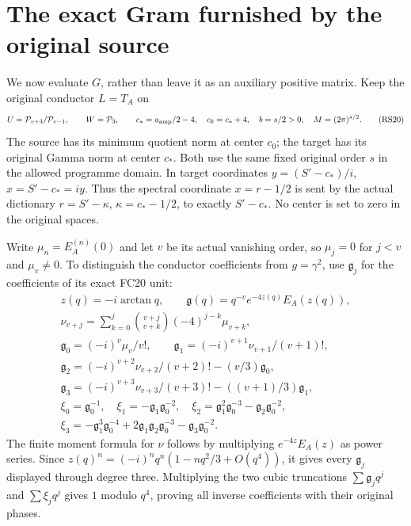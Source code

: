 \section{The exact Gram furnished by the original source}
We now evaluate $G$, rather than leave it as an auxiliary
positive matrix. Keep the original conductor $L=T_A$ on
\begin{equation}
 U=\mathcal P_{v+3}/\mathcal P_{v-1},\qquad
 W=\mathcal P_3,\qquad
 c_*=a_{\rm amp}/2-4,\quad c_0=c_*+4,\quad
 b=s/2>0,\quad M=(2\pi)^{s/2}.
 \tag{RS20}
\end{equation}
The source has its minimum quotient norm at center $c_0$;
the target has its original Gamma norm at center $c_*$.
Both use the same fixed original order $s$ in the allowed
programme domain. In target coordinates
$y=(S'-c_*)/i$, $x=S'-c_*=iy$.
Thus the spectral coordinate $x=r-1/2$ is sent by the actual
dictionary $r=S'-\kappa$, $\kappa=c_*-1/2$, to exactly
$S'-c_*$. No center is set to zero in the original spaces.

Write $\mu_n=E_A^{(n)}(0)$ and let $v$ be its actual
vanishing order, so $\mu_j=0$ for $j<v$ and $\mu_v\ne0$.
To distinguish the conductor coefficients from $g=\gamma^2$,
use $\mathfrak g_j$ for the coefficients of its exact FC20 unit:
\begin{equation}
 \begin{gathered}
 z(q)=-i\arctan q,\qquad
 \mathfrak g(q)=q^{-v}e^{-4z(q)}E_A(z(q)),\\
 \nu_{v+j}=\sum_{k=0}^{j}\binom{v+j}{v+k}(-4)^{j-k}\mu_{v+k},\\
 \mathfrak g_0=(-i)^v\mu_v/v!,\qquad
 \mathfrak g_1=(-i)^{v+1}\nu_{v+1}/(v+1)!,\\
 \mathfrak g_2=(-i)^{v+2}\nu_{v+2}/(v+2)!-(v/3)\mathfrak g_0,\\
 \mathfrak g_3=(-i)^{v+3}\nu_{v+3}/(v+3)!-((v+1)/3)\mathfrak g_1,\\
 \xi_0=\mathfrak g_0^{-1},\quad
 \xi_1=-\mathfrak g_1\mathfrak g_0^{-2},\quad
 \xi_2=\mathfrak g_1^2\mathfrak g_0^{-3}-\mathfrak g_2\mathfrak g_0^{-2},\\
 \xi_3=-\mathfrak g_1^3\mathfrak g_0^{-4}
       +2\mathfrak g_1\mathfrak g_2\mathfrak g_0^{-3}
       -\mathfrak g_3\mathfrak g_0^{-2}.
 \end{gathered}
 \tag{RS21}
\end{equation}
The finite moment formula for $\nu$ follows by multiplying
$e^{-4z}E_A(z)$ as power series. Since
$z(q)^n=(-i)^nq^n(1-nq^2/3+O(q^4))$, it gives every
$\mathfrak g_j$ displayed through degree three. Multiplying
the two cubic truncations $\sum\mathfrak g_jq^j$ and
$\sum\xi_jq^j$ gives $1$ modulo $q^4$, proving all inverse
coefficients with their original phases.

